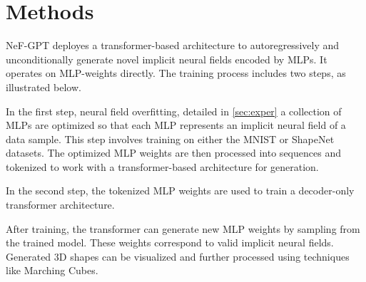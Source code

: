\section{Methods}

NeF-GPT deployes a transformer-based architecture to autoregressively and unconditionally generate novel implicit neural fields encoded by MLPs. It operates on MLP-weights directly. The training process includes two steps, as illustrated below.

In the first step, neural field overfitting, detailed in \ref{sec:exper} a collection of MLPs are optimized so that each MLP represents an implicit neural field of a data sample. This step involves training on either the MNIST or ShapeNet datasets. The optimized MLP weights are then processed into sequences and tokenized to work with a transformer-based architecture for generation.

In the second step, the tokenized MLP weights are used to train a decoder-only transformer architecture.

After training, the transformer can generate new MLP weights by sampling from the trained model. These weights correspond to valid implicit neural fields. Generated 3D shapes can be visualized and further processed using techniques like Marching Cubes.